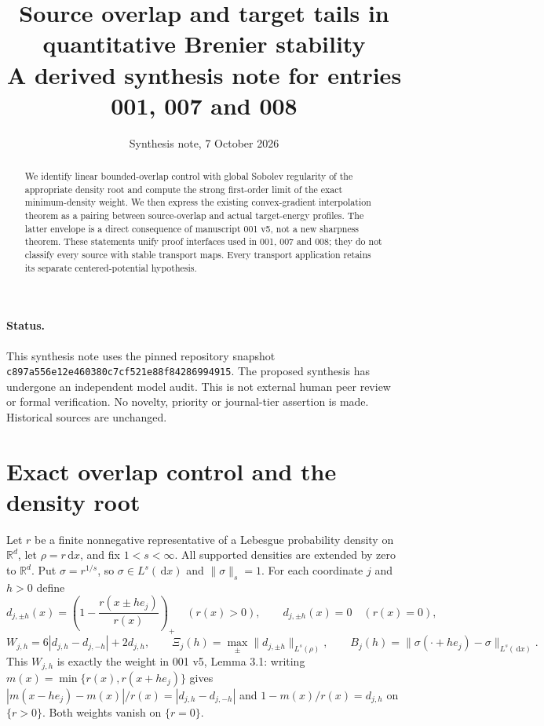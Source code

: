 \documentclass[11pt]{article}
\title{Source overlap and target tails in quantitative Brenier stability\\\large A derived synthesis note for entries 001, 007 and 008}
\author{}
\date{Synthesis note, 7 October 2026}
\theoremstyle{remark}\newtheorem{remark}[theorem]{Remark}
\newcommand{\R}{\mathbb R}
\newcommand{\dd}{\,\mathrm d}
\newcommand{\norm}[1]{\lVert#1\rVert}
\begin{document}
\maketitle
\begin{abstract}
We identify linear bounded-overlap control with global Sobolev regularity of the appropriate density root and compute the strong first-order limit of the exact minimum-density weight. We then express the existing convex-gradient interpolation theorem as a pairing between source-overlap and actual target-energy profiles. The latter envelope is a direct consequence of manuscript 001 v5, not a new sharpness theorem. These statements unify proof interfaces used in 001, 007 and 008; they do not classify every source with stable transport maps. Every transport application retains its separate centered-potential hypothesis.
\end{abstract}
\paragraph{Status.} This synthesis note uses the pinned repository snapshot
\texttt{c897a556e12e460380c7}\allowbreak\texttt{cf521e88f84286994915}. The proposed synthesis has undergone an independent model audit. This is not external human peer review or formal verification. No novelty, priority or journal-tier assertion is made. Historical sources are unchanged.

\section{Exact overlap control and the density root}
Let $r$ be a finite nonnegative representative of a Lebesgue probability density on $\R^d$, let $\rho=r\dd x$, and fix $1<s<\infty$. All supported densities are extended by zero to $\R^d$. Put $\sigma=r^{1/s}$, so $\sigma\in L^s(\dd x)$ and $\norm\sigma_s=1$. For each coordinate $j$ and $h>0$ define
\[
 d_{j,\pm h}(x)=\left(1-\frac{r(x\pm he_j)}{r(x)}\right)_+
 \quad(r(x)>0),
 \qquad d_{j,\pm h}(x)=0\quad(r(x)=0),
\]
\[
 W_{j,h}=6|d_{j,h}-d_{j,-h}|+2d_{j,h},\qquad
 \Xi_j(h)=\max_{\pm}\norm{d_{j,\pm h}}_{L^s(\rho)},\qquad
 B_j(h)=\norm{\sigma(\cdot+he_j)-\sigma}_{L^s(\dd x)}.
\]
This $W_{j,h}$ is exactly the weight in 001 v5, Lemma 3.1: writing
$m(x)=\min\{r(x),r(x+he_j)\}$ gives
$|m(x-he_j)-m(x)|/r(x)=|d_{j,h}-d_{j,-h}|$ and
$1-m(x)/r(x)=d_{j,h}$ on $\{r>0\}$. Both weights vanish on $\{r=0\}$.
\end{document}
